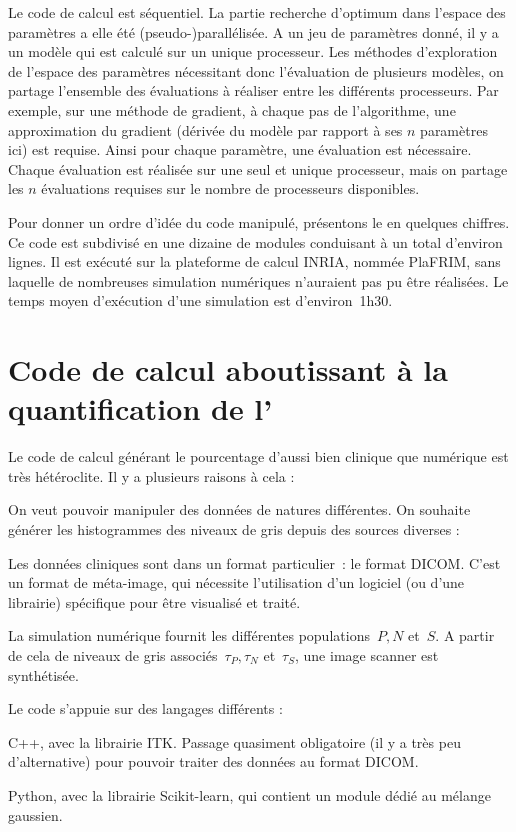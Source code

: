 \documentclass[main.tex]{subfiles}
\begin{document}
\bigskip
Le code de calcul est séquentiel. La partie recherche d'optimum dans l'espace des paramètres a elle été (pseudo-)parallélisée. A un jeu de paramètres donné, il y a un modèle qui est calculé sur un unique processeur. Les méthodes d'exploration de l'espace des paramètres nécessitant donc l'évaluation de plusieurs modèles, on partage l'ensemble des évaluations à réaliser entre les différents processeurs. Par exemple, sur une méthode de gradient, à chaque pas de l'algorithme, une approximation du gradient (dérivée du modèle par rapport à ses $n$ paramètres ici) est requise. Ainsi pour chaque paramètre, une évaluation est nécessaire. Chaque évaluation est réalisée sur une seul et unique processeur, mais on partage les $n$ évaluations requises sur le nombre de processeurs disponibles.


Pour donner un ordre d'idée du code manipulé, présentons le en quelques chiffres. Ce code est subdivisé en une dizaine de modules conduisant à un total d'environ  lignes. Il est exécuté sur la plateforme de calcul INRIA, nommée PlaFRIM, sans laquelle de nombreuses simulation numériques n'auraient pas pu être réalisées. Le temps moyen d'exécution d'une simulation est d'environ~1h30. 


\section{Code de calcul aboutissant à la quantification de l'\hetero}
Le code de calcul générant le pourcentage d'\hetero aussi bien clinique que numérique est très hétéroclite. Il y a plusieurs raisons à cela :
\begin{myitemize}
\item On veut pouvoir manipuler des données de natures différentes. On souhaite générer les histogrammes des niveaux de gris depuis des sources diverses :
\begin{myitemize}[label=$-$]
\item Les données cliniques sont dans un format particulier~: le format DICOM. C'est un format de méta-image, qui nécessite l'utilisation d'un logiciel (ou d'une librairie) spécifique pour être visualisé et traité. 
\item La simulation numérique fournit les différentes populations~$P,N$ et~$S$. A partir de cela  de niveaux de gris associés~$\tau_P, \tau_N$ et~$\tau_S$, une image scanner est synthétisée.
\end{myitemize}
\item Le code s'appuie sur des langages différents :
\begin{myitemize}[label=$-$]
\item C++, avec la librairie ITK. Passage quasiment obligatoire (il y a très peu d'alternative) pour pouvoir traiter des données au format DICOM.
\item Python, avec la librairie Scikit-learn, qui contient un module dédié au mélange gaussien.
\end{myitemize}
\end{myitemize}
\end{document}
